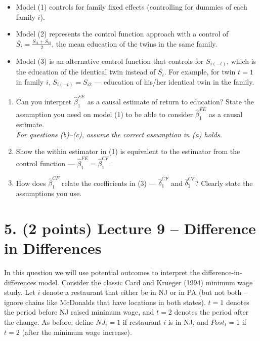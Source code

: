\documentclass[12pt]{article}
\begin{document}
\begin{itemize}
  \item Model (1) controls for family fixed effects (controlling for dummies of each family $i$).
  \item Model (2) represents the control function approach with a control of $\bar{S_i} = \frac{S_{i1}+S_{i2}}{2}$, the mean education of the twins in the same family.
  \item Model (3) is an alternative control function that controls for $S_{i(-t)}$, which is the education of the identical twin instead of $\bar{S_i}$. For example, for twin $t=1$ in family $i$, $S_{i(-t)}=S_{i2}$ — education of his/her identical twin in the family.
\end{itemize}

\begin{enumerate}[label=\textbf{(\alph*)}, leftmargin=1.5em]
  \item Can you interpret $\hat{\beta}_1^{FE}$ as a causal estimate of return to education? State the assumption you need on model (1) to be able to consider $\hat{\beta}_1^{FE}$ as a causal estimate.\\[0.5em]
  \newpage
  \textit{For questions (b)--(c), assume the correct assumption in (a) holds.}\\[0.5em]

  \item Show the within estimator in (1) is equivalent to the estimator from the control function — $\hat{\beta}_1^{FE} = \hat{\beta}_1^{CF}$.\\[0.5em]
\newpage
  \item How does $\hat{\beta}_1^{CF}$ relate the coefficients in (3) — $\hat{\delta}_1^{CF}$ and $\hat{\delta}_2^{CF}$? Clearly state the assumptions you use.\\[0.5em]
  \newpage
\end{enumerate}

\newpage

\newpage
\section*{5. (2 points) Lecture 9 -- Difference in Differences}
In this question we will use potential outcomes to interpret the difference-in-differences model. Consider the classic Card and Krueger (1994) minimum wage study. Let $i$ denote a restaurant that either be in NJ or in PA (but not both -- ignore chains like McDonalds that have locations in both states). $t=1$ denotes the period before NJ raised minimum wage, and $t=2$ denotes the period after the change. As before, define $NJ_i=1$ if restaurant $i$ is in NJ, and $Post_t=1$ if $t=2$ (after the minimum wage increase).
\end{document}
